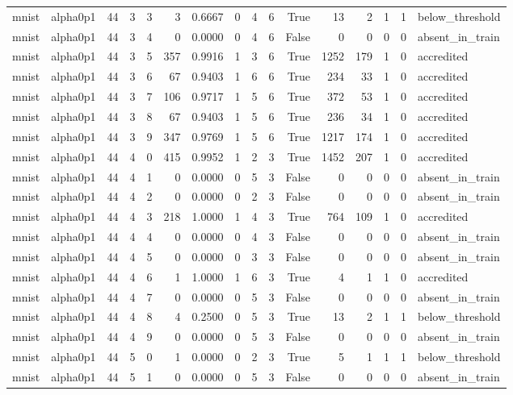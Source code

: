 \begin{tabular}{llrrrrrrrrrrrrrl}
mnist & alpha0p1 & 44 & 3 & 3 & 3 & 0.6667 & 0 & 4 & 6 & True & 13 & 2 & 1 & 1 & below\_threshold \\
mnist & alpha0p1 & 44 & 3 & 4 & 0 & 0.0000 & 0 & 4 & 6 & False & 0 & 0 & 0 & 0 & absent\_in\_train \\
mnist & alpha0p1 & 44 & 3 & 5 & 357 & 0.9916 & 1 & 3 & 6 & True & 1252 & 179 & 1 & 0 & accredited \\
mnist & alpha0p1 & 44 & 3 & 6 & 67 & 0.9403 & 1 & 6 & 6 & True & 234 & 33 & 1 & 0 & accredited \\
mnist & alpha0p1 & 44 & 3 & 7 & 106 & 0.9717 & 1 & 5 & 6 & True & 372 & 53 & 1 & 0 & accredited \\
mnist & alpha0p1 & 44 & 3 & 8 & 67 & 0.9403 & 1 & 5 & 6 & True & 236 & 34 & 1 & 0 & accredited \\
mnist & alpha0p1 & 44 & 3 & 9 & 347 & 0.9769 & 1 & 5 & 6 & True & 1217 & 174 & 1 & 0 & accredited \\
mnist & alpha0p1 & 44 & 4 & 0 & 415 & 0.9952 & 1 & 2 & 3 & True & 1452 & 207 & 1 & 0 & accredited \\
mnist & alpha0p1 & 44 & 4 & 1 & 0 & 0.0000 & 0 & 5 & 3 & False & 0 & 0 & 0 & 0 & absent\_in\_train \\
mnist & alpha0p1 & 44 & 4 & 2 & 0 & 0.0000 & 0 & 2 & 3 & False & 0 & 0 & 0 & 0 & absent\_in\_train \\
mnist & alpha0p1 & 44 & 4 & 3 & 218 & 1.0000 & 1 & 4 & 3 & True & 764 & 109 & 1 & 0 & accredited \\
mnist & alpha0p1 & 44 & 4 & 4 & 0 & 0.0000 & 0 & 4 & 3 & False & 0 & 0 & 0 & 0 & absent\_in\_train \\
mnist & alpha0p1 & 44 & 4 & 5 & 0 & 0.0000 & 0 & 3 & 3 & False & 0 & 0 & 0 & 0 & absent\_in\_train \\
mnist & alpha0p1 & 44 & 4 & 6 & 1 & 1.0000 & 1 & 6 & 3 & True & 4 & 1 & 1 & 0 & accredited \\
mnist & alpha0p1 & 44 & 4 & 7 & 0 & 0.0000 & 0 & 5 & 3 & False & 0 & 0 & 0 & 0 & absent\_in\_train \\
mnist & alpha0p1 & 44 & 4 & 8 & 4 & 0.2500 & 0 & 5 & 3 & True & 13 & 2 & 1 & 1 & below\_threshold \\
mnist & alpha0p1 & 44 & 4 & 9 & 0 & 0.0000 & 0 & 5 & 3 & False & 0 & 0 & 0 & 0 & absent\_in\_train \\
mnist & alpha0p1 & 44 & 5 & 0 & 1 & 0.0000 & 0 & 2 & 3 & True & 5 & 1 & 1 & 1 & below\_threshold \\
mnist & alpha0p1 & 44 & 5 & 1 & 0 & 0.0000 & 0 & 5 & 3 & False & 0 & 0 & 0 & 0 & absent\_in\_train \\

\end{tabular}
